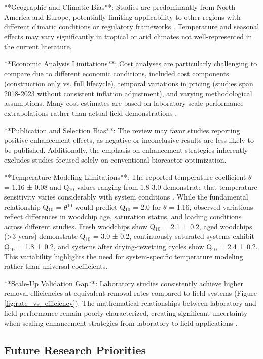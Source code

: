 \documentclass[12pt,a4paper]{article}
\begin{document}
**Geographic and Climatic Bias**: Studies are predominantly from North America and Europe, potentially limiting applicability to other regions with different climatic conditions or regulatory frameworks \citep{RN1023, RN258}. Temperature and seasonal effects may vary significantly in tropical or arid climates not well-represented in the current literature.

**Economic Analysis Limitations**: Cost analyses are particularly challenging to compare due to different economic conditions, included cost components (construction only vs. full lifecycle), temporal variations in pricing (studies span 2018-2023 without consistent inflation adjustment), and varying methodological assumptions. Many cost estimates are based on laboratory-scale performance extrapolations rather than actual field demonstrations \citep{RN289}.

**Publication and Selection Bias**: The review may favor studies reporting positive enhancement effects, as negative or inconclusive results are less likely to be published. Additionally, the emphasis on enhancement strategies inherently excludes studies focused solely on conventional bioreactor optimization.

**Temperature Modeling Limitations**: The reported temperature coefficient $\theta$ = 1.16 ± 0.08 and Q$_{10}$ values ranging from 1.8-3.0 demonstrate that temperature sensitivity varies considerably with system conditions \citep{RN242, RN228}. While the fundamental relationship Q$_{10}$ = $\theta$$^{10}$ would predict Q$_{10}$ = 2.0 for $\theta$ = 1.16, observed variations reflect differences in woodchip age, saturation status, and loading conditions across different studies. Fresh woodchips show Q$_{10}$ = 2.1 ± 0.2, aged woodchips (>3 years) demonstrate Q$_{10}$ = 3.0 ± 0.2, continuously saturated systems exhibit Q$_{10}$ = 1.8 ± 0.2, and systems after drying-rewetting cycles show Q$_{10}$ = 2.4 ± 0.2. This variability highlights the need for system-specific temperature modeling rather than universal coefficients.

**Scale-Up Validation Gap**: Laboratory studies consistently achieve higher removal efficiencies at equivalent removal rates compared to field systems (Figure \ref{fig:rate_vs_efficiency}). The mathematical relationships between laboratory and field performance remain poorly characterized, creating significant uncertainty when scaling enhancement strategies from laboratory to field applications \citep{RN312}.

\subsection{Future Research Priorities}
\end{document}
